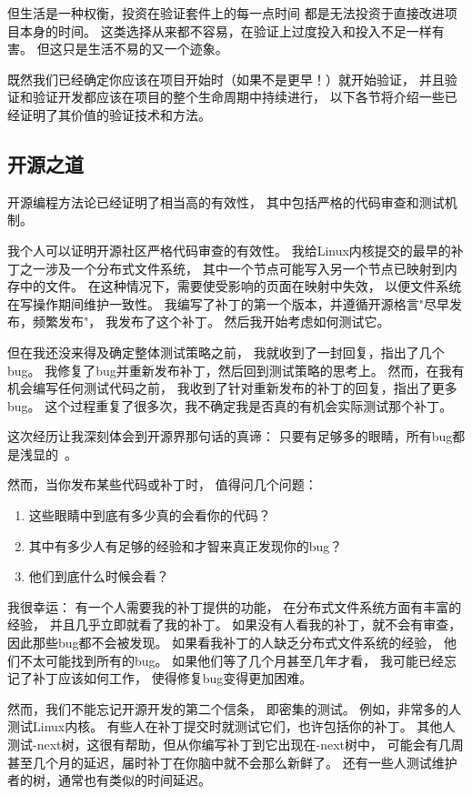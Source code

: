 但生活是一种权衡，投资在验证套件上的每一点时间
都是无法投资于直接改进项目本身的时间。
这类选择从来都不容易，在验证上过度投入和投入不足一样有害。
但这只是生活不易的又一个迹象。

既然我们已经确定你应该在项目开始时（如果不是更早！）就开始验证，
并且验证和验证开发都应该在项目的整个生命周期中持续进行，
以下各节将介绍一些已经证明了其价值的验证技术和方法。

\subsection{开源之道}
\label{sec:debugging:The Open Source Way}

开源编程方法论已经证明了相当高的有效性，
其中包括严格的代码审查和测试机制。

我个人可以证明开源社区严格代码审查的有效性。
我给Linux内核提交的最早的补丁之一涉及一个分布式文件系统，
其中一个节点可能写入另一个节点已映射到内存中的文件。
在这种情况下，需要使受影响的页面在映射中失效，
以便文件系统在写操作期间维护一致性。
我编写了补丁的第一个版本，并遵循开源格言"尽早发布，频繁发布"，
我发布了这个补丁。
然后我开始考虑如何测试它。

但在我还没来得及确定整体测试策略之前，
我就收到了一封回复，指出了几个bug。
我修复了bug并重新发布补丁，然后回到测试策略的思考上。
然而，在我有机会编写任何测试代码之前，
我收到了针对重新发布的补丁的回复，指出了更多bug。
这个过程重复了很多次，我不确定我是否真的有机会实际测试那个补丁。

这次经历让我深刻体会到开源界那句话的真谛：
只要有足够多的眼睛，所有bug都是浅显的~\cite{EricSRaymond99b}。

然而，当你发布某些代码或补丁时，
值得问几个问题：

\begin{enumerate}
\item	这些眼睛中到底有多少真的会看你的代码？
\item	其中有多少人有足够的经验和才智来真正发现你的bug？
\item	他们到底什么时候会看？
\end{enumerate}

我很幸运：
有一个人需要我的补丁提供的功能，
在分布式文件系统方面有丰富的经验，
并且几乎立即就看了我的补丁。
如果没有人看我的补丁，就不会有审查，
因此那些bug都不会被发现。
如果看我补丁的人缺乏分布式文件系统的经验，
他们不太可能找到所有的bug。
如果他们等了几个月甚至几年才看，
我可能已经忘记了补丁应该如何工作，
使得修复bug变得更加困难。

然而，我们不能忘记开源开发的第二个信条，
即密集的测试。
例如，非常多的人测试Linux内核。
有些人在补丁提交时就测试它们，也许包括你的补丁。
其他人测试-next树，这很有帮助，但从你编写补丁到它出现在-next树中，
可能会有几周甚至几个月的延迟，届时补丁在你脑中就不会那么新鲜了。
还有一些人测试维护者的树，通常也有类似的时间延迟。

